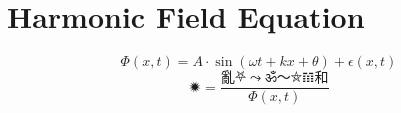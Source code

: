 \documentclass{article}
\begin{document}
\section*{Harmonic Field Equation}
\[
\Phi(x, t) = A \cdot \sin(\omega t + kx + \theta) + \epsilon(x,t)
\]
\[
\text{🟒} = \frac{亂⛧⤳ॐ〜⛤𝌻和}{\Phi(x, t)}
\]
\end{document}
